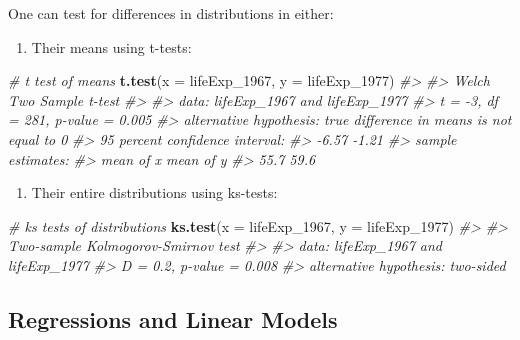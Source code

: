 \documentclass[
]{book}
\newenvironment{Shaded}{\begin{snugshade}}{\end{snugshade}}
\newcommand{\CommentTok}[1]{\textcolor[rgb]{0.56,0.35,0.01}{\textit{#1}}}
\newcommand{\DataTypeTok}[1]{\textcolor[rgb]{0.13,0.29,0.53}{#1}}
\newcommand{\DecValTok}[1]{\textcolor[rgb]{0.00,0.00,0.81}{#1}}
\newcommand{\KeywordTok}[1]{\textcolor[rgb]{0.13,0.29,0.53}{\textbf{#1}}}
\newcommand{\NormalTok}[1]{#1}
\providecommand{\tightlist}{%
  \setlength{\itemsep}{0pt}\setlength{\parskip}{0pt}}
\begin{document}
One can test for differences in distributions in either:

\begin{enumerate}
\def\labelenumi{\arabic{enumi})}
\tightlist
\item
  Their means using t-tests:
\end{enumerate}

\begin{Shaded}
\begin{Highlighting}[]
\CommentTok{# t test of means}
\KeywordTok{t.test}\NormalTok{(}\DataTypeTok{x =}\NormalTok{ lifeExp_}\DecValTok{1967}\NormalTok{, }\DataTypeTok{y =}\NormalTok{ lifeExp_}\DecValTok{1977}\NormalTok{)}
\CommentTok{#> }
\CommentTok{#>  Welch Two Sample t-test}
\CommentTok{#> }
\CommentTok{#> data:  lifeExp_1967 and lifeExp_1977}
\CommentTok{#> t = -3, df = 281, p-value = 0.005}
\CommentTok{#> alternative hypothesis: true difference in means is not equal to 0}
\CommentTok{#> 95 percent confidence interval:}
\CommentTok{#>  -6.57 -1.21}
\CommentTok{#> sample estimates:}
\CommentTok{#> mean of x mean of y }
\CommentTok{#>      55.7      59.6}
\end{Highlighting}
\end{Shaded}

\begin{enumerate}
\def\labelenumi{\arabic{enumi})}
\setcounter{enumi}{1}
\tightlist
\item
  Their entire distributions using ks-tests:
\end{enumerate}

\begin{Shaded}
\begin{Highlighting}[]
\CommentTok{# ks tests of distributions}
\KeywordTok{ks.test}\NormalTok{(}\DataTypeTok{x =}\NormalTok{ lifeExp_}\DecValTok{1967}\NormalTok{, }\DataTypeTok{y =}\NormalTok{ lifeExp_}\DecValTok{1977}\NormalTok{)}
\CommentTok{#> }
\CommentTok{#>  Two-sample Kolmogorov-Smirnov test}
\CommentTok{#> }
\CommentTok{#> data:  lifeExp_1967 and lifeExp_1977}
\CommentTok{#> D = 0.2, p-value = 0.008}
\CommentTok{#> alternative hypothesis: two-sided}
\end{Highlighting}
\end{Shaded}

\hypertarget{regressions-and-linear-models}{%
\subsection{Regressions and Linear Models}\label{regressions-and-linear-models}}
\end{document}
